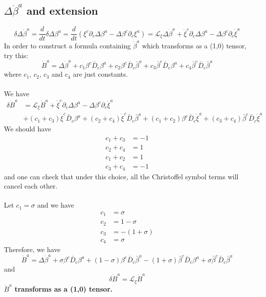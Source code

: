\documentclass{article}
\begin{document}
\subsection{$\Delta {\dot \beta}^{a}$ and extension}
\[
\delta \Delta {\dot \beta}^{a} = \frac{d}{dt} \delta \Delta\beta^{a} = \frac{d}{dt}(\xi^{c}\partial_{c}\Delta \beta^{a} - \Delta \beta^{c}\partial_{c}\xi^{a}) = \mathcal{L}_{\xi}\Delta {\dot \beta}^{a} + {\dot \xi}^{c}\partial_{c}\Delta \beta^{a} - \Delta \beta^{c} \partial_{c}{\dot \xi}^{a}
\]
In order to construct a formula containing ${\dot \beta}^{a}$ which transforms as a (1,0) tensor, try this:
\[
{\dot B}^{a} = \Delta {\dot \beta}^{a} + c_{1}\beta^{c}{\bar D}_{c}\beta^{a} + c_{2}\beta^{c}{\bar D}_{c}{\bar \beta}^{a} + c_{3}{\bar \beta}^{c}{\bar D}_{c}\beta^{a} + c_{4}{\bar \beta}^{c}{\bar D}_{c}{\bar \beta}^{a}
\]
where $c_{1}$, $c_{2}$, $c_{3}$ and $c_{4}$ are just constants. \\
\\
We have
\begin{align*}
\delta {\dot B}^{a} & = \mathcal{L}_{\xi}{\dot B}^{a} + {\dot \xi}^{c}\partial_{c} \Delta \beta^{a} - \Delta \beta^{c}\partial_{c}{\dot \xi}^{a}\\
& + (c_{1} + c_{3}){\dot \xi}^{c}{\bar D}_{c}\beta^{a} + (c_{2} + c_{4}) {\dot \xi}^{c}{\bar D}_{c}{\bar \beta}^{a} +(c_{1} + c_{2})\beta^{c}{\bar D}_{c}{\dot \xi}^{a} + (c_{3} + c_{4}){\bar \beta}^{c}{\bar D}_{c}{\dot \xi}^{a}
\end{align*}
We should have
\begin{align*}
c_{1} + c_{3} & = -1\\
c_{2} + c_{4} & = 1\\
c_{1} + c_{2} & = 1\\
c_{3} + c_{4} & = -1
\end{align*}
and one can check that under this choice, all the Christoffel symbol terms will cancel each other.\\
\\
Let $c_{1} = \sigma$ and we have
\begin{align*}
c_{1} & = \sigma\\
c_{2} & = 1 - \sigma\\
c_{3} & = -(1+\sigma)\\
c_{4} & = \sigma 
\end{align*}
Therefore, we have
\[
{\dot B}^{a} = \Delta {\dot \beta}^{a} + \sigma \beta^{c}{\bar D}_{c}\beta^{a} + (1 - \sigma)\beta^{c}{\bar D}_{c}{\bar \beta}^{a} - (1 + \sigma){\bar \beta}^{c}{\bar D}_{c}\beta^{a} + \sigma{\bar \beta}^{c}{\bar D}_{c}{\bar \beta}^{a}
\]
and
\[
\boxed{
\delta {\dot B}^{a} = \mathcal{L}_{\xi}{\dot B}^{a}
}
\]
{\bf {\color{red}${\dot B}^{a}$ transforms as a (1,0) tensor.}}
\end{document}
